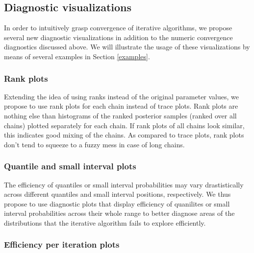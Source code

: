 \documentclass[american,]{article}
\begin{document}
\hypertarget{diagnostic-visualizations}{%
\subsection{Diagnostic visualizations}\label{diagnostic-visualizations}}

In order to intuitively grasp convergence of iterative algorithms, we
propose several new diagnostic visualizations in addition to the numeric
convergence diagnostics discussed above. We will illustrate the usage of
these visualizations by means of several examples in Section
\ref{examples}.

\hypertarget{rank-plots}{%
\subsubsection{Rank plots}\label{rank-plots}}

Extending the idea of using ranks instead of the original parameter
values, we propose to use rank plots for each chain instead
of trace plots. Rank plots are nothing else than histograms of the
ranked posterior samples (ranked over all chains) plotted separately for
each chain. If rank plots of all chains look similar, this indicates
good mixing of the chains. As compared to trace plots, rank plots don't
tend to squeeze to a fuzzy mess in case of long chains.

\hypertarget{quantile-and-small-interval-plots}{%
\subsubsection{Quantile and small interval
plots}\label{quantile-and-small-interval-plots}}

The efficiency of quantiles or small interval probabilities may vary
drastistically across different quantiles and small interval positions,
respectively. We thus propose to use diagnostic plots that display
efficiency of quanilites or small interval probabilities across their
whole range to better diagnose areas of the distributions that the
iterative algorithm fails to explore efficiently.

\hypertarget{efficiency-change-plots}{%
\subsubsection{Efficiency per iteration plots}\label{efficiency-change-plots}}
\end{document}
